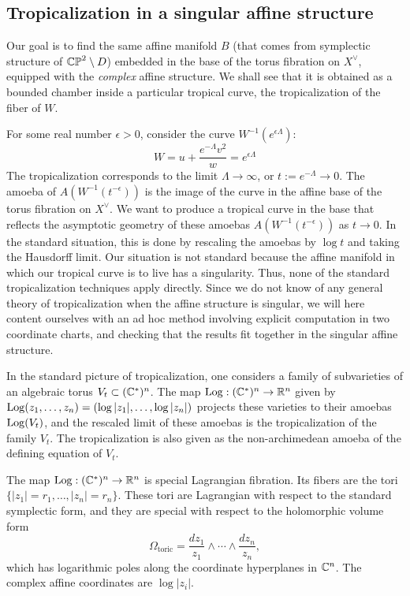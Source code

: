 \documentclass[12pt]{amsart}
\begin{document}
\subsection{Tropicalization in a singular affine structure}
\label{sec:tropicalization}

Our goal is to find the same affine manifold $B$ (that comes from
symplectic structure of $\mathbb{CP}^2\setminus D$) embedded in the base of
the torus fibration on $X^\vee$, equipped with the \emph{complex}
affine structure. We shall see that it is obtained as a bounded
chamber inside a particular tropical curve, the tropicalization of the
fiber of $W$. 

 For some real number $\epsilon > 0$, consider the curve
$W^{-1}(e^{\epsilon \Lambda})$:
\begin{equation}
  \label{eq:fiber-to-trop}
  W = u + \frac{e^{-\Lambda}v^2}{w} = e^{\epsilon \Lambda}
\end{equation}
 The tropicalization corresponds to the limit $\Lambda \to \infty$, or
$t := e^{-\Lambda} \to 0$. 
The amoeba of $A(W^{-1}(t^{-\epsilon}))$ is the image of the curve in the affine base of the torus fibration on $X^\vee$.
We want to produce a tropical curve in the base that reflects the asymptotic geometry of these amoebas $A(W^{-1}(t^{-\epsilon}))$ as $t \to 0$. In the standard situation, this is done by rescaling the amoebas by $\log t$ and taking the Hausdorff limit. Our situation is not standard because the affine manifold in which our tropical curve is to live has a singularity. Thus, none of the standard tropicalization techniques \cite{tropical-AG} apply directly. Since we do not know of any general theory of tropicalization when the affine structure is singular, we will here content ourselves with an ad hoc method involving explicit computation in two coordinate charts, and checking that the results fit together in the singular affine structure.

In the standard picture of tropicalization, one considers a family
of subvarieties of an algebraic torus $V_t \subset (\mathbb{C}^*)^n$. The map
$\mathrm{Log}: (\mathbb{C}^*)^n \to \mathbb{R}^n$ given by $\mathrm{Log}(z_1,\dots,z_n) =
(\log|z_1|,\dots,\log|z_n|)$ projects these varieties to their amoebas
$\mathrm{Log}(V_t)$, and the rescaled limit of these amoebas is the
tropicalization of the family $V_t$. The tropicalization is also given
as the non-archimedean amoeba of the defining equation of $V_t$.

The map $\mathrm{Log}: (\mathbb{C}^*)^n \to \mathbb{R}^n$ is special Lagrangian fibration. Its
fibers are the tori $\{|z_1| = r_1, \dots,|z_n| = r_n\}$. These tori
are Lagrangian with respect to the standard symplectic form, and they
are special with respect to the holomorphic volume form
\begin{equation}
  \label{eq:toric-vol-form}
  \Omega_{\text{toric}} = \frac{dz_1}{z_1} \wedge \cdots \wedge \frac{dz_n}{z_n},
\end{equation}
which has logarithmic poles along the coordinate hyperplanes in
$\mathbb{C}^n$. The complex affine coordinates are $\log |z_i|$.
\end{document}
